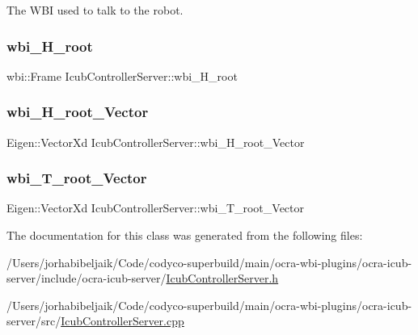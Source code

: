 The W\+BI used to talk to the robot. \hypertarget{classIcubControllerServer_afd983b69c043eedf958e53582b22195a}{}\label{classIcubControllerServer_afd983b69c043eedf958e53582b22195a} 
\subsubsection{\texorpdfstring{wbi\+\_\+\+H\+\_\+root}{wbi\_H\_root}}
{\footnotesize\ttfamily wbi\+::\+Frame Icub\+Controller\+Server\+::wbi\+\_\+\+H\+\_\+root\hspace{0.3cm}{\ttfamily [private]}}

\hypertarget{classIcubControllerServer_a42f6a8db660da9dbafbc57941b1ee12f}{}\label{classIcubControllerServer_a42f6a8db660da9dbafbc57941b1ee12f} 
\subsubsection{\texorpdfstring{wbi\+\_\+\+H\+\_\+root\+\_\+\+Vector}{wbi\_H\_root\_Vector}}
{\footnotesize\ttfamily Eigen\+::\+Vector\+Xd Icub\+Controller\+Server\+::wbi\+\_\+\+H\+\_\+root\+\_\+\+Vector\hspace{0.3cm}{\ttfamily [private]}}

\hypertarget{classIcubControllerServer_a818b66e75b7f9457a6a5bcbb3c1306a7}{}\label{classIcubControllerServer_a818b66e75b7f9457a6a5bcbb3c1306a7} 
\subsubsection{\texorpdfstring{wbi\+\_\+\+T\+\_\+root\+\_\+\+Vector}{wbi\_T\_root\_Vector}}
{\footnotesize\ttfamily Eigen\+::\+Vector\+Xd Icub\+Controller\+Server\+::wbi\+\_\+\+T\+\_\+root\+\_\+\+Vector\hspace{0.3cm}{\ttfamily [private]}}



The documentation for this class was generated from the following files\+:\begin{DoxyCompactItemize}
\item 
/\+Users/jorhabibeljaik/\+Code/codyco-\/superbuild/main/ocra-\/wbi-\/plugins/ocra-\/icub-\/server/include/ocra-\/icub-\/server/\hyperlink{IcubControllerServer_8h}{Icub\+Controller\+Server.\+h}\item 
/\+Users/jorhabibeljaik/\+Code/codyco-\/superbuild/main/ocra-\/wbi-\/plugins/ocra-\/icub-\/server/src/\hyperlink{IcubControllerServer_8cpp}{Icub\+Controller\+Server.\+cpp}\end{DoxyCompactItemize}
